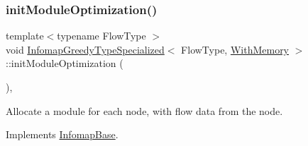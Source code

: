 \mbox{\label{classInfomapGreedyTypeSpecialized_3_01FlowType_00_01WithMemory_01_4_a3b8cb78e45b8879069d662c3791a702e}} 
\subsubsection{\texorpdfstring{init\+Module\+Optimization()}{initModuleOptimization()}}
{\footnotesize\ttfamily template$<$typename Flow\+Type $>$ \\
void \mbox{\hyperlink{classInfomapGreedyTypeSpecialized}{Infomap\+Greedy\+Type\+Specialized}}$<$ Flow\+Type, \mbox{\hyperlink{structWithMemory}{With\+Memory}} $>$\+::init\+Module\+Optimization (\begin{DoxyParamCaption}{ }\end{DoxyParamCaption})\hspace{0.3cm}{\ttfamily [protected]}, {\ttfamily [virtual]}}

Allocate a module for each node, with flow data from the node. 

Implements \mbox{\hyperlink{classInfomapBase_a8347fea5ed1cd22a27c7d972496e7d90}{Infomap\+Base}}.


